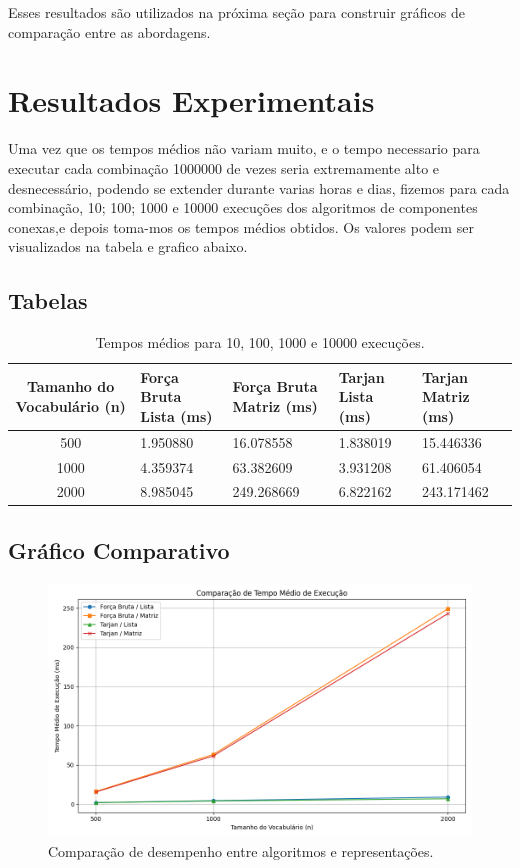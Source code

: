 \documentclass[12pt]{article}
\begin{document}
\noindent Esses resultados são utilizados na próxima seção para construir gráficos de comparação entre as abordagens.

\section{Resultados Experimentais}

Uma vez que os tempos médios não variam muito, e o tempo necessario para executar cada combinação 1000000 de vezes seria extremamente alto e desnecessário, podendo se extender durante varias horas e dias, fizemos para cada combinação, 10; 100; 1000 e 10000 execuções dos algoritmos de componentes conexas,e depois toma-mos os tempos médios obtidos. Os valores podem ser visualizados na tabela e grafico abaixo.

\subsection{Tabelas}

\begin{table}[H]
\centering
\caption{Tempos médios para 10, 100, 1000 e 10000 execuções.}
\begin{tabularx}{\textwidth}{|c|X|X|X|X|}
\hline
\textbf{Tamanho do Vocabulário (n)} & \textbf{Força Bruta Lista (ms)} & \textbf{Força Bruta Matriz (ms)} & \textbf{Tarjan Lista (ms)} & \textbf{Tarjan Matriz (ms)} \\
\hline
500   & 1.950880 & 16.078558 & 1.838019 & 15.446336 \\
\hline
1000  & 4.359374 & 63.382609 & 3.931208 & 61.406054 \\
\hline
2000  & 8.985045 & 249.268669 & 6.822162 & 243.171462 \\
\hline
\end{tabularx}
\end{table}


\subsection{Gráfico Comparativo}

\begin{figure}[H]
    \centering
    \includegraphics[width=1\textwidth]{grafico.png}
    \caption{Comparação de desempenho entre algoritmos e representações.}
\end{figure}
\end{document}
